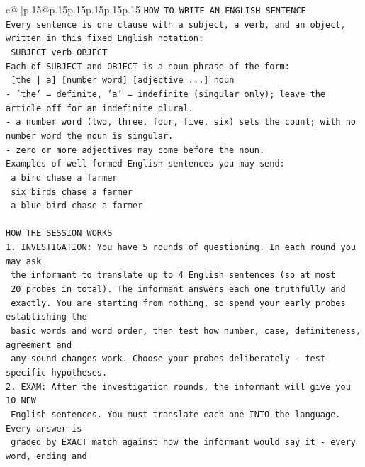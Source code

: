 \documentclass{article}
\begin{document}
{\begin{supertabular}{c@{$\;$}|p{.15\linewidth}@{}p{.15\linewidth}p{.15\linewidth}p{.15\linewidth}p{.15\linewidth}p{.15\linewidth}}
{{{\texttt{HOW TO WRITE AN ENGLISH SENTENCE} \\
\texttt{Every sentence is one clause with a subject, a verb, and an object, written in this fixed English notation:} \\
\texttt{    SUBJECT  verb  OBJECT} \\
\texttt{Each of SUBJECT and OBJECT is a noun phrase of the form:} \\
\texttt{    {[}the | a{]}  {[}number word{]}  {[}adjective ...{]}  noun} \\
\texttt{{-} 'the' = definite, 'a' = indefinite (singular only); leave the article off for an indefinite plural.} \\
\texttt{{-} a number word (two, three, four, five, six) sets the count; with no number word the noun is singular.} \\
\texttt{{-} zero or more adjectives may come before the noun.} \\
\texttt{Examples of well{-}formed English sentences you may send:} \\
\texttt{    a bird chase a farmer} \\
\texttt{    six birds chase a farmer} \\
\texttt{    a blue bird chase a farmer} \\
\\ 
\texttt{HOW THE SESSION WORKS} \\
\texttt{1. INVESTIGATION: You have 5 rounds of questioning. In each round you may ask} \\
\texttt{   the informant to translate up to 4 English sentences (so at most} \\
\texttt{   20 probes in total). The informant answers each one truthfully and} \\
\texttt{   exactly. You are starting from nothing, so spend your early probes establishing the} \\
\texttt{   basic words and word order, then test how number, case, definiteness, agreement and} \\
\texttt{   any sound changes work. Choose your probes deliberately {-} test specific hypotheses.} \\
\texttt{2. EXAM: After the investigation rounds, the informant will give you 10 NEW} \\
\texttt{   English sentences. You must translate each one INTO the language. Every answer is} \\
\texttt{   graded by EXACT match against how the informant would say it {-} every word, ending and} \\
}}}
\end{supertabular}}
\end{document}
